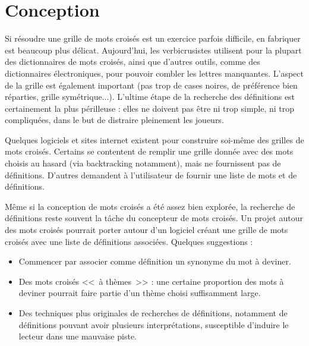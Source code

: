 \documentclass{article}
\begin{document}
\section{Conception}

Si résoudre une grille de mots croisés est un exercice parfois difficile, en fabriquer est beaucoup plus délicat. Aujourd'hui, les verbicrusistes utilisent pour la plupart des dictionnaires de mots croisés, ainsi que d'autres outils, comme des dictionnaires électroniques, pour pouvoir combler les lettres manquantes. L'aspect de la grille est également important (pas trop de cases noires, de préférence bien réparties, grille symétrique...). L'ultime étape de la recherche des définitions est certainement la plus périlleuse : elles ne doivent pas être ni trop simple, ni trop compliquées, dans le but de distraire pleinement les joueurs.

Quelques logiciels et sites internet existent pour construire soi-même des grilles de mots croisés. Certains se contentent de remplir une grille donnée avec des mots choisis au hasard (via backtracking notamment), mais ne fournissent pas de définitions. D'autres demandent à l'utilisateur de fournir une liste de mots et de définitions.

Même si la conception de mots croisés a été assez bien explorée, la recherche de définitions reste souvent la tâche du concepteur de mots croisés. Un projet autour des mots croisés pourrait porter autour d'un logiciel créant une grille de mots croisés avec une liste de définitions associées. Quelques suggestions :

\begin{itemize}
	\item Commencer par associer comme définition un synonyme du mot à deviner.
	\item Des mots croisés <<~à thèmes~>> : une certaine proportion des mots à deviner pourrait faire partie d'un thème choisi suffisamment large.
	\item Des techniques plus originales de recherches de définitions, notamment de définitions pouvant avoir plusieurs interprétations, susceptible d'induire le lecteur dans une mauvaise piste. %
\end{itemize}





\end{document}
